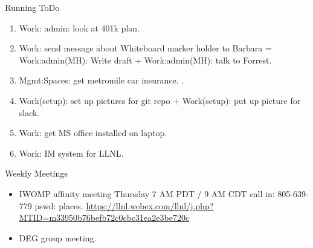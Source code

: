 \begin{columns}
\begin{column}{0.5\linewidth}
\begin{block}{Running ToDo}
\begin{enumerate}
        \item \tiny Work: admin: look at 401k plan. 
        \item \tiny Work: send message about Whiteboard marker holder to
          Barbara = Work:admin(MH): Write draft +
          Work:admin(MH): talk to Forrest. 
        \item \tiny Mgmt:Spaces: get metromile car insurance.   . 
        \item \tiny Work(setup): set up pictures for git repo +
          Work(setup): put up picture for slack. 

        \item \tiny Work: get MS office installed on laptop. 
        \item \tiny Work: IM system for LLNL. 

        \end{enumerate}
      \end{block}
 

      \begin{block}{Weekly Meetings}
        \begin{itemize}
          \tiny \item \tiny IWOMP affinity meeting Thursday 7 AM PDT / 9 AM
          CDT call in: 805-639-779 pswd: places. \url{https://llnl.webex.com/llnl/j.php?MTID=m33950b76befb72c0cbc31ea2e3be720c}
        \item \tiny DEG group meeting.  
        \end{itemize}
      \end{block} 
     


\end{column}
\end{columns}
